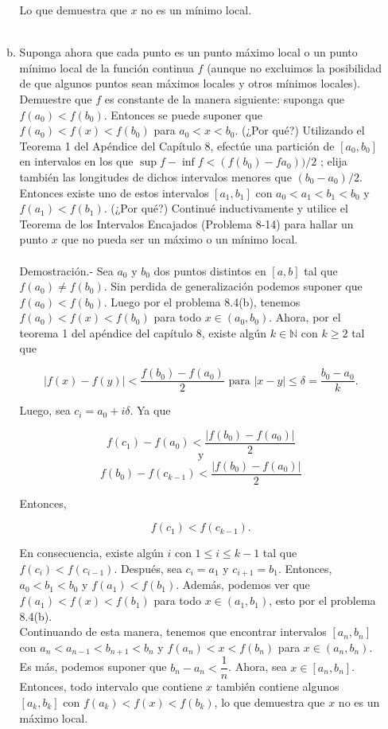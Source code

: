 \begin{enumerate}[\bfseries 1.]
\begin{enumerate}[(a)]
		Lo que demuestra que $x$ no es un mínimo local.\\\\

	    \item Suponga ahora que cada punto es un punto máximo local o un punto mínimo local de la función continua $f$ (aunque no excluimos la posibilidad de que algunos puntos sean máximos locales y otros mínimos locales). Demuestre que $f$ es constante de la manera siguiente: suponga que $f(a_0) < f(b_0)$. Entonces se puede suponer que $f(a_0) < f(x) < f(b_0)$ para $a_0<x<b_0$. (¿Por qué?) Utilizando el Teorema 1 del Apéndice del Capítulo 8, efectúe una partición de $[a_0, b_0]$ en intervalos en los que $\sup f - \inf f < (f(b_0) - f a_0))/ 2$ ; elija también las longitudes de dichos intervalos menores que $(b_0 -a_0)/2$. Entonces existe uno de estos intervalos $[a_1, b_1]$ con $a_0 < a_1 < b_1 < b_0$ y $f(a_1) < f(b_1)$. (¿Por qué?) Continué inductivamente y utilice el Teorema de los Intervalos Encajados (Problema 8-14) para hallar un punto $x$ que no pueda ser un máximo o un mínimo local.\\\\
		Demostración.-\; Sea $a_0$ y $b_0$ dos puntos distintos en $[a,b]$ tal que $f(a_0)\neq f(b_0)$. Sin perdida de generalización podemos suponer que $f(a_0)<f(b_0)$. Luego por el problema 8.4(b), tenemos $f(a_0)<f(x)<f(b_0)$ para todo $x\in (a_0,b_0)$. Ahora, por el teorema 1 del apéndice del capítulo 8, existe algún $k\in \mathbb{N}$ con $k\geq 2$ tal que

		$$|f(x)-f(y)|<\dfrac{f(b_0)-f(a_0)}{2}\mbox{ para } |x-y|\leq \delta =\dfrac{b_0-a_0}{k}.$$

		Luego, sea $c_i=a_0+i\delta$. Ya que 

		$$f(c_1)-f(a_0)<\dfrac{|f(b_0)-f(a_0)|}{2}$$
		$$\mbox{y}$$
		$$f(b_0)-f(c_{k-1})<\dfrac{|f(b_0)-f(a_0)|}{2}$$

		Entonces,

		$$f(c_1)<f(c_{k-1}).$$

		En consecuencia, existe algún $i$ con $1\leq i \leq k-1$ tal que $f(c_i)<f(c_{i-1})$. Después, sea $c_i=a_1$ y $c_{i+1}=b_1$. Entonces, $a_0<b_1<b_0$ y $f(a_1)<f(b_1)$. Además, podemos ver que $f(a_1)<f(x)<f(b_1)$ para todo $x\in(a_1,b_1)$, esto por el problema 8.4(b).\\

		Continuando de esta manera, tenemos que encontrar intervalos $[a_n,b_n]$ con $a_n<a_{n-1}<b_{n+1}<b_n$ y $f(a_n)<x<f(b_n)$ para $x\in(a_n,b_n)$. Es más, podemos suponer que $b_n-a_n<\dfrac{1}{n}$. Ahora, sea $x\in [a_n,b_n]$. Entonces, todo intervalo que contiene $x$ también contiene algunos $[a_k,b_k]$ con $f(a_k)<f(x)<f(b_k)$, lo que demuestra que $x$ no es un máximo local.\\\\


\end{enumerate}
\end{enumerate}
